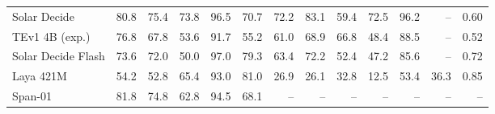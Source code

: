 \begin{table}[p]
{\begin{tabular}{@{}lrrrrrrrrrrrr@{}}
Solar Decide & 80.8 & 75.4 & 73.8 & 96.5 & 70.7 & 72.2 & 83.1 & 59.4 & 72.5 & 96.2 & -- & 0.60 \\
TEv1 4B (exp.) & 76.8 & 67.8 & 53.6 & 91.7 & 55.2 & 61.0 & 68.9 & 66.8 & 48.4 & 88.5 & -- & 0.52 \\
Solar Decide Flash & 73.6 & 72.0 & 50.0 & 97.0 & 79.3 & 63.4 & 72.2 & 52.4 & 47.2 & 85.6 & -- & 0.72 \\
Laya 421M & 54.2 & 52.8 & 65.4 & 93.0 & 81.0 & 26.9 & 26.1 & 32.8 & 12.5 & 53.4 & 36.3 & 0.85 \\
Span-01 & 81.8 & 74.8 & 62.8 & 94.5 & 68.1 & -- & -- & -- & -- & -- & -- & -- \\
\bottomrule
\end{tabular}}
\end{table}
